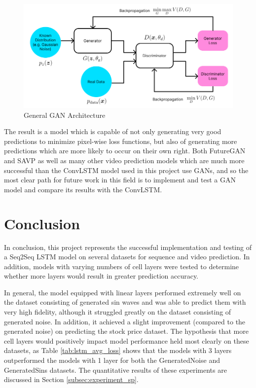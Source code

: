 \documentclass{scrartcl}
\begin{document}
\begin{figure}[H]
	\begin{center}
		\includegraphics[width=1\textwidth]{figures/gan_arch.png}
	\end{center}
	\caption{General GAN Architecture}
	\label{fig:gan_arch}
\end{figure}

The result is a model which is capable of not only generating very good
predictions to minimize pixel-wise loss functions, but also of generating more
predictions which are more likely to occur on their own right. Both FutureGAN
\cite{futuregan} and SAVP \cite{savp} as well as many other video prediction
models which are much more successful than the ConvLSTM model used in this
project use GANs, and so the most clear path for future work in this field is
to implement and test a GAN model and compare its results with the ConvLSTM.

\section{Conclusion}
\label{sec:conclusion}

In conclusion, this project represents the successful implementation and
testing of a Seq2Seq LSTM model on several datasets for sequence and video
prediction. In addition, models with varying numbers of cell layers were tested
to determine whether more layers would result in greater prediction accuracy.

In general, the model equipped with linear layers performed extremely well on
the dataset consisting of generated sin waves and was able to predict them with
very high fidelity, although it struggled greatly on the dataset consisting of
generated noise. In addition, it achieved a slight improvement (compared to the
generated noise) on predicting the stock price dataset. The hypothesis that
more cell layers would positively impact model performance held most clearly on
these datasets, as Table \ref{tab:lstm_avg_loss} shows that the models with 3
layers outperformed the models with 1 layer for both the GeneratedNoise and
GeneratedSins datasets. The quantitative results of these experiments are
discussed in Section \ref{subsec:experiment_sp}.
\end{document}
